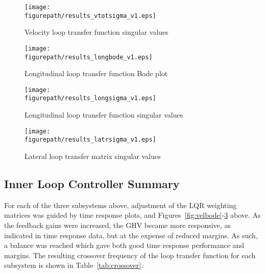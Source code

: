 \documentclass[]{../sty/aiaa-tc}
\newcommand{\figurepath}{../fig}
\begin{document}
  \begin{figure}[H]
    \begin{center}
      \texttt{[image: \\figurepath/results\_vtotsigma\_v1.eps]}
       \caption{Velocity loop transfer function singular values}
    \end{center}
  \end{figure}

  \begin{figure}[H]
    \begin{center}
      \texttt{[image: \\figurepath/results\_longbode\_v1.eps]}
       \caption{Longitudinal loop transfer function Bode plot\label{fig:longbode}}
    \end{center}
  \end{figure}

  \begin{figure}[H]
    \begin{center}
      \texttt{[image: \\figurepath/results\_longsigma\_v1.eps]}
       \caption{Longitudinal loop transfer function singular values\label{fig:longsigma}}
    \end{center}
  \end{figure}

  \begin{figure}[H]
    \begin{center}
      \texttt{[image: \\figurepath/results\_latrsigma\_v1.eps]}
      \caption{Lateral loop transfer matrix singular values\label{fig:latrsingularval}}
    \end{center}
  \end{figure}

  \subsection{Inner Loop Controller Summary}

  For each of the three subsystems above, adjustment of the LQR weighting matrices was guided by time response plots, and Figures~\ref{fig:velbode}-\ref{fig:latrsingularval} above.
  As the feedback gains were increased, the GHV became more responsive, as indicated in time response data, but at the expense of reduced margins.
  As such, a balance was reached which gave both good time response performance and margins.
  The resulting crossover frequency of the loop transfer function for each subsystem is shown in Table~\ref{tab:crossover}.
\end{document}
